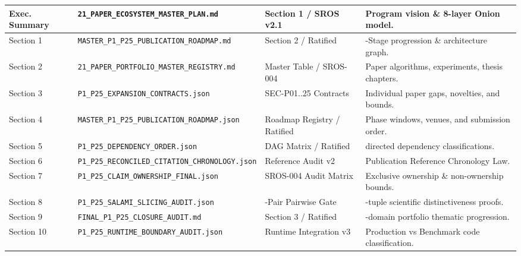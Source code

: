 \documentclass[11pt,letterpaper]{article}
\begin{document}
\begin{longtable}{>{\raggedright\sloppy\arraybackslash}p{1.8cm}>{\raggedright\sloppy\arraybackslash}p{6.8cm}>{\raggedright\sloppy\arraybackslash}p{3.0cm}>{\raggedright\sloppy\arraybackslash}p{3.6cm}}
\bottomrule
\endlastfoot
Exec. Summary & \texttt{21\_\allowbreak PAPER\_\allowbreak ECOSYSTEM\_\allowbreak MASTER\_\allowbreak PLAN.\allowbreak md} & Section 1 / SROS v2.1 & Program vision \& 8-layer Onion model. \\ \midrule
Section 1 & \texttt{MASTER\_\allowbreak P1\_\allowbreak P25\_\allowbreak PUBLICATION\_\allowbreak ROADMAP.\allowbreak md} & Section 2 / Ratified & 7-Stage progression \& architecture graph. \\ \midrule
Section 2 & \texttt{21\_\allowbreak PAPER\_\allowbreak PORTFOLIO\_\allowbreak MASTER\_\allowbreak REGISTRY.\allowbreak md} & Master Table / SROS-004 & Paper algorithms, experiments, thesis chapters. \\ \midrule
Section 3 & \texttt{P1\_\allowbreak P25\_\allowbreak EXPANSION\_\allowbreak CONTRACTS.\allowbreak json} & SEC-P01..25 Contracts & Individual paper gaps, novelties, and bounds. \\ \midrule
Section 4 & \texttt{MASTER\_\allowbreak P1\_\allowbreak P25\_\allowbreak PUBLICATION\_\allowbreak ROADMAP.\allowbreak json} & Roadmap Registry / Ratified & Phase windows, venues, and submission order. \\ \midrule
Section 5 & \texttt{P1\_\allowbreak P25\_\allowbreak DEPENDENCY\_\allowbreak ORDER.\allowbreak json} & DAG Matrix / Ratified & 24 directed dependency classifications. \\ \midrule
Section 6 & \texttt{P1\_\allowbreak P25\_\allowbreak RECONCILED\_\allowbreak CITATION\_\allowbreak CHRONOLOGY.\allowbreak json} & Reference Audit v2 & Publication Reference Chronology Law. \\ \midrule
Section 7 & \texttt{P1\_\allowbreak P25\_\allowbreak CLAIM\_\allowbreak OWNERSHIP\_\allowbreak FINAL.\allowbreak json} & SROS-004 Audit Matrix & Exclusive ownership \& non-ownership bounds. \\ \midrule
Section 8 & \texttt{P1\_\allowbreak P25\_\allowbreak SALAMI\_\allowbreak SLICING\_\allowbreak AUDIT.\allowbreak json} & 300-Pair Pairwise Gate & 4-tuple scientific distinctiveness proofs. \\ \midrule
Section 9 & \texttt{FINAL\_\allowbreak P1\_\allowbreak P25\_\allowbreak CLOSURE\_\allowbreak AUDIT.\allowbreak md} & Section 3 / Ratified & 9-domain portfolio thematic progression. \\ \midrule
Section 10 & \texttt{P1\_\allowbreak P25\_\allowbreak RUNTIME\_\allowbreak BOUNDARY\_\allowbreak AUDIT.\allowbreak json} & Runtime Integration v3 & Production vs Benchmark code classification. \\ \midrule

\end{longtable}
\end{document}
